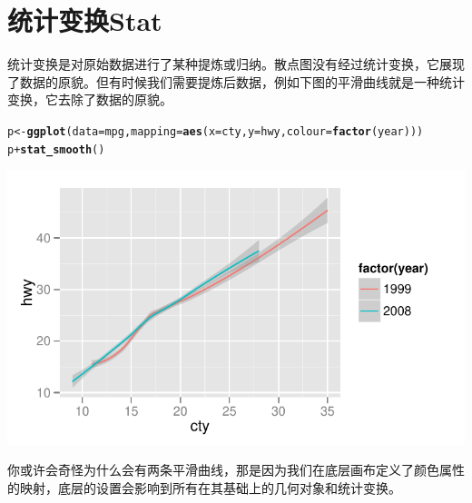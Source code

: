 \documentclass[UTF8,10pt]{ctexart}\usepackage{graphicx, color}
\makeatletter
\def\maxwidth{ %
  \ifdim\Gin@nat@width>\linewidth
    \linewidth
  \else
    \Gin@nat@width
  \fi
}
\newcommand{\hlfunctioncall}[1]{\textcolor[rgb]{0.501960784313725,0,0.329411764705882}{\textbf{#1}}}%
\newenvironment{kframe}{%
 \def\at@end@of@kframe{}%
 \ifinner\ifhmode%
  \def\at@end@of@kframe{\end{minipage}}%
  \begin{minipage}{\columnwidth}%
 \fi\fi%
 \def\FrameCommand##1{\hskip\@totalleftmargin \hskip-\fboxsep
 \colorbox{shadecolor}{##1}\hskip-\fboxsep
     \hskip-\linewidth \hskip-\@totalleftmargin \hskip\columnwidth}%
 \MakeFramed {\advance\hsize-\width
   \@totalleftmargin\z@ \linewidth\hsize
   \@setminipage}}%
 {\par\unskip\endMakeFramed%
 \at@end@of@kframe}
\newenvironment{knitrout}{}{} %
\makeatother
\begin{document}
\section{统计变换Stat}
统计变换是对原始数据进行了某种提炼或归纳。散点图没有经过统计变换，它展现了数据的原貌。但有时候我们需要提炼后数据，例如下图的平滑曲线就是一种统计变换，它去除了数据的原貌。
\begin{knitrout}
\color{fgcolor}\begin{kframe}
\begin{alltt}
p <- \hlfunctioncall{ggplot}(data=mpg,mapping=\hlfunctioncall{aes}(x=cty,y=hwy,colour=\hlfunctioncall{factor}(year)))
p + \hlfunctioncall{stat_smooth}()
\end{alltt}
\end{kframe}

{\centering \includegraphics[width=\maxwidth]{figure/unnamed-chunk-4} 

}


\end{knitrout}

你或许会奇怪为什么会有两条平滑曲线，那是因为我们在底层画布定义了颜色属性的映射，底层的设置会影响到所有在其基础上的几何对象和统计变换。
\end{document}
